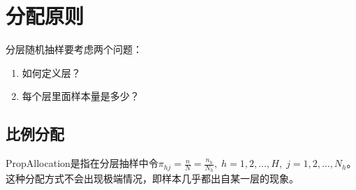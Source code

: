 \section{分配原则}

分层随机抽样要考虑两个问题：
\begin{enumerate}
	\item 如何定义层？
	\item 每个层里面样本量是多少？
\end{enumerate}

\subsection{比例分配}
\gls{PropAllocation}是指在分层抽样中令$\pi_{hj}=\frac{n}{N}=\frac{n_h}{N_h},\;h=1,2,\dots,H,\;j=1,2,\dots,N_h$。这种分配方式不会出现极端情况，即样本几乎都出自某一层的现象。
